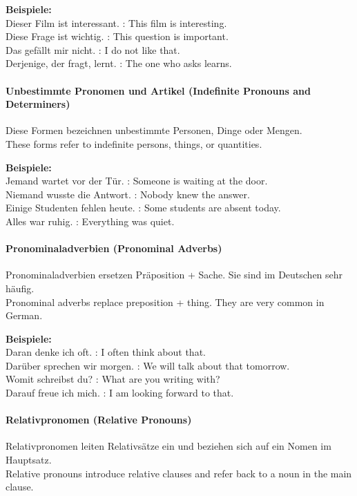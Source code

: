 \documentclass[a4paper]{article}
\begin{document}
            \textbf{Beispiele:}\\
            Dieser Film ist interessant. : This film is interesting.\\
            Diese Frage ist wichtig. : This question is important.\\
            Das gefällt mir nicht. : I do not like that.\\
            Derjenige, der fragt, lernt. : The one who asks learns.
        
        \paragraph{Unbestimmte Pronomen und Artikel {\small (Indefinite Pronouns and Determiners)}}
            Diese Formen bezeichnen unbestimmte Personen, Dinge oder Mengen.\\
            These forms refer to indefinite persons, things, or quantities.
            
            \textbf{Beispiele:}\\
            Jemand wartet vor der Tür. : Someone is waiting at the door.\\
            Niemand wusste die Antwort. : Nobody knew the answer.\\
            Einige Studenten fehlen heute. : Some students are absent today.\\
            Alles war ruhig. : Everything was quiet.
        
        \paragraph{Pronominaladverbien {\small (Pronominal Adverbs)}}
            Pronominaladverbien ersetzen Präposition + Sache. Sie sind im Deutschen sehr häufig.\\
            Pronominal adverbs replace preposition + thing. They are very common in German.
            
            \textbf{Beispiele:}\\
            Daran denke ich oft. : I often think about that.\\
            Darüber sprechen wir morgen. : We will talk about that tomorrow.\\
            Womit schreibst du? : What are you writing with?\\
            Darauf freue ich mich. : I am looking forward to that.
        
        \paragraph{Relativpronomen {\small (Relative Pronouns)}}
            Relativpronomen leiten Relativsätze ein und beziehen sich auf ein Nomen im Hauptsatz.\\
            Relative pronouns introduce relative clauses and refer back to a noun in the main clause.
            
\end{document}
